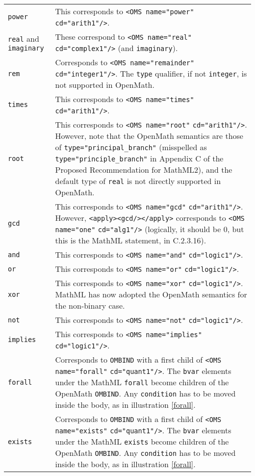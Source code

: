 \documentclass[twoside,11pt]{article}
\begin{document}
\begin{longtable}{
        >{\raggedright\let\\=\tabularnewline}p{2in}
        >{\raggedright\let\\=\tabularnewline}p{3in}}
\verb+power+&This corresponds to \verb+<OMS name="power"+ \verb+cd="arith1"/>+.\\
\verb+real+ and \verb+imaginary+&These correspond to
\verb+<OMS name="real"+ \verb+cd="complex1"/>+ (and \verb+imaginary+).\\
\verb+rem+&Corresponds to \verb+<OMS name="remainder"+ 
\verb+cd="integer1"/>+. The \verb+type+ qualifier, if not \verb+integer+, is 
not supported in OpenMath.\\
\verb+times+&This corresponds to \verb+<OMS name="times"+ \verb+cd="arith1"/>+.\\
\verb+root+&This corresponds to \verb+<OMS name="root"+
\verb+cd="arith1"/>+. However, note that the OpenMath semantics are
those of \verb+type="principal_branch"+ (misspelled as
\verb+type="principle_branch"+ in Appendix C of the Proposed
Recommendation for MathML2), and the default type of \verb+real+ is
not directly supported in OpenMath.\\
\verb+gcd+&This corresponds to
\verb+<OMS name="gcd"+ \verb+cd="arith1"/>+. However,
\verb+<apply><gcd/></apply>+ corresponds to 
\verb+<OMS name="one"+ \verb+cd="alg1"/>+ (logically, it should be
$0$, but this is the MathML statement, in C.2.3.16).\\
\verb+and+&This corresponds to \verb+<OMS name="and"+ \verb+cd="logic1"/>+.\\
\verb+or+&This corresponds to \verb+<OMS name="or"+ \verb+cd="logic1"/>+.\\
\verb+xor+&This corresponds to
\verb+<OMS name="xor"+ \verb+cd="logic1"/>+. MathML has now adopted the
OpenMath semantics for the non-binary case.\\
\verb+not+&This corresponds to \verb+<OMS name="not"+ \verb+cd="logic1"/>+.\\
\verb+implies+&This corresponds to \verb+<OMS name="implies"+ \verb+cd="logic1"/>+.\\
\verb+forall+&Corresponds to \verb+OMBIND+ with a first child of
\verb+<OMS name="forall"+ \verb+cd="quant1"/>+. The \verb+bvar+ elements under
the MathML \verb+forall+ become children of the OpenMath
\verb+OMBIND+. Any \verb+condition+ has to be moved inside the
body, as in illustration \ref{forall}.\\
\verb+exists+&Corresponds to \verb+OMBIND+ with a first child of
\verb+<OMS name="exists"+ \verb+cd="quant1"/>+. The \verb+bvar+ elements under
the MathML \verb+exists+ become children of the OpenMath
\verb+OMBIND+. Any \verb+condition+ has to be moved inside the
body, as in illustration \ref{forall}.\\

\end{longtable}
\end{document}
